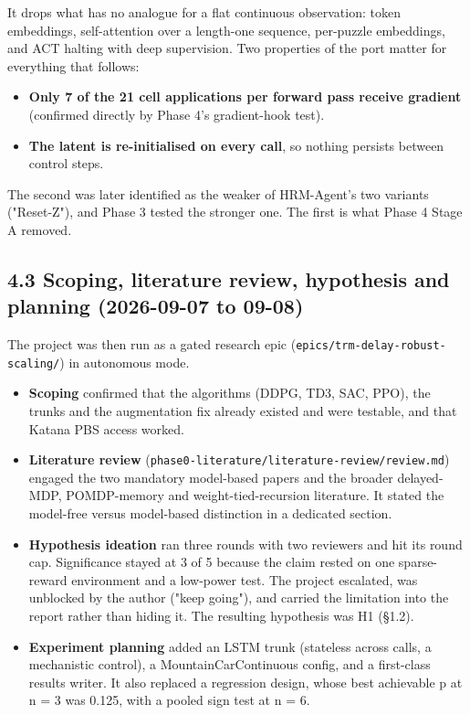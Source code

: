 \documentclass[11pt]{article}
\begin{document}
It drops what has no analogue for a flat continuous observation: token embeddings, self-attention over a length-one sequence, per-puzzle embeddings, and ACT halting with deep supervision. Two properties of the port matter for everything that follows:



\begin{itemize}
\item \textbf{Only 7 of the 21 cell applications per forward pass receive gradient} (confirmed directly by Phase 4's gradient-hook test).
\item \textbf{The latent is re-initialised on every call}, so nothing persists between control steps.
\end{itemize}



The second was later identified as the weaker of HRM-Agent's two variants ("Reset-Z"), and Phase 3 tested the stronger one. The first is what Phase 4 Stage A removed.



\subsection*{4.3 Scoping, literature review, hypothesis and planning (2026-09-07 to 09-08)}



The project was then run as a gated research epic (\texttt{epics/\allowbreak{}trm-delay-robust-scaling/\allowbreak{}}) in autonomous mode.



\begin{itemize}
\item \textbf{Scoping} confirmed that the algorithms (DDPG, TD3, SAC, PPO), the trunks and the augmentation fix already existed and were testable, and that Katana PBS access worked.
\item \textbf{Literature review} (\texttt{phase0-literature/\allowbreak{}literature-review/\allowbreak{}review.\allowbreak{}md}) engaged the two mandatory model-based papers and the broader delayed-MDP, POMDP-memory and weight-tied-recursion literature. It stated the model-free versus model-based distinction in a dedicated section.
\item \textbf{Hypothesis ideation} ran three rounds with two reviewers and hit its round cap. Significance stayed at 3 of 5 because the claim rested on one sparse-reward environment and a low-power test. The project escalated, was unblocked by the author ("keep going"), and carried the limitation into the report rather than hiding it. The resulting hypothesis was H1 (\S{}1.2).
\item \textbf{Experiment planning} added an LSTM trunk (stateless across calls, a mechanistic control), a MountainCarContinuous config, and a first-class results writer. It also replaced a regression design, whose best achievable p at n = 3 was 0.125, with a pooled sign test at n = 6.
\end{itemize}
\end{document}
